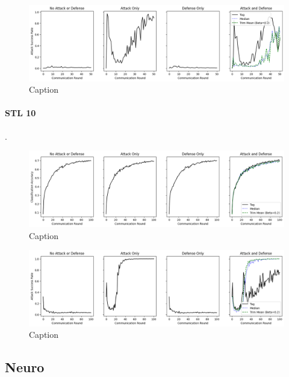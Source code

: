 \documentclass{article} %
\begin{document}
\begin{figure}[H]
    \centering
    \includegraphics[width=\textwidth]{cifar_100/classic/tag/distributed/alpha10000--alpha_val10000/visuals/pois_accuracy--n_malicious4--beta0.2.png}
    \caption{Caption}
    \label{fig:my_label}
\end{figure}


%
\paragraph{STL 10}.

\begin{figure}[H]
    \centering
    \includegraphics[width=\textwidth]{stl_10/classic/tag/distributed/alpha10000--alpha_val10000/visuals/clean_accuracy--n_malicious4--beta0.2.png}
    \caption{Caption}
    \label{fig:my_label}
\end{figure}

\begin{figure}[H]
    \centering
    \includegraphics[width=\textwidth]{stl_10/classic/tag/distributed/alpha10000--alpha_val10000/visuals/pois_accuracy--n_malicious4--beta0.2.png}
    \caption{Caption}
    \label{fig:my_label}
\end{figure}


% 
\pagebreak
\subsection{Neuro}
\end{document}
